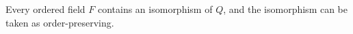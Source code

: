 Every ordered field $F$ contains an isomorphism of $Q$, and the isomorphism can be taken as order-preserving.